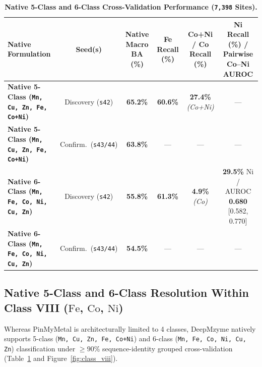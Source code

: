 \documentclass[10pt,a4paper,twocolumn]{article}
\begin{document}
\begin{table}[t!]
  \centering
  \caption{\textbf{Native 5-Class and 6-Class Cross-Validation Performance (\texttt{7,398} Sites).}}
  \label{tab:class_viii}
  \footnotesize
  \begin{tabular}{lccccc}
    \toprule
    \textbf{Native Formulation} & \textbf{Seed(s)} & \textbf{Native Macro BA (\%)} & \textbf{Fe Recall (\%)} & \textbf{Co+Ni / Co Recall (\%)} & \textbf{Ni Recall (\%) / Pairwise Co--Ni AUROC} \\
    \midrule
    \textbf{Native 5-Class (\texttt{Mn, Cu, Zn, Fe, Co+Ni})} & Discovery (\texttt{s42}) & \textbf{65.2\%} & \textbf{60.6\%} & \textbf{27.4\%} \textit{(Co+Ni)} & --- \\
    \textbf{Native 5-Class (\texttt{Mn, Cu, Zn, Fe, Co+Ni})} & Confirm.\ (\texttt{s43/44}) & \textbf{63.8\%} & --- & --- & --- \\
    \textbf{Native 6-Class (\texttt{Mn, Fe, Co, Ni, Cu, Zn})} & Discovery (\texttt{s42}) & \textbf{55.8\%} & \textbf{61.3\%} & \textbf{4.9\%} \textit{(Co)} & \textbf{29.5\%} Ni \,/\, AUROC \textbf{0.680} [0.582, 0.770] \\
    \textbf{Native 6-Class (\texttt{Mn, Fe, Co, Ni, Cu, Zn})} & Confirm.\ (\texttt{s43/44}) & \textbf{54.5\%} & --- & --- & --- \\
    \bottomrule
  \end{tabular}
\end{table}

\subsection{Native 5-Class and 6-Class Resolution Within Class VIII ($\text{Fe}$, $\text{Co}$, $\text{Ni}$)}

Whereas PinMyMetal is architecturally limited to 4 classes, DeepMzyme natively supports 5-class (\texttt{Mn, Cu, Zn, Fe, Co+Ni}) and 6-class (\texttt{Mn, Fe, Co, Ni, Cu, Zn}) classification under $\ge 90\%$ sequence-identity grouped cross-validation (Table~\ref{tab:class_viii} and Figure~\ref{fig:class_viii}).
\end{document}
